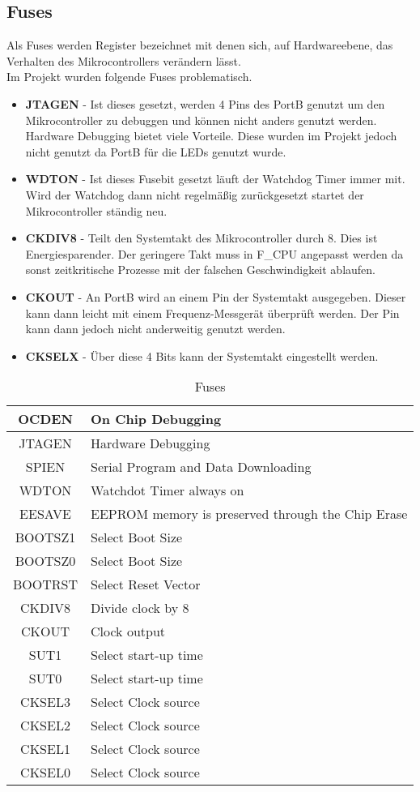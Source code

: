 \subsection{Fuses}
\label{sec:Fuses}
Als Fuses werden Register bezeichnet mit denen sich, auf Hardwareebene, das Verhalten des Mikrocontrollers verändern lässt. \\
Im Projekt wurden folgende Fuses problematisch.
\begin{itemize}
\item \textbf{JTAGEN} - Ist dieses  gesetzt, werden 4 Pins des PortB genutzt um den Mikrocontroller zu debuggen und können nicht anders genutzt werden. Hardware Debugging bietet viele Vorteile. Diese wurden im Projekt jedoch nicht genutzt da PortB für die LEDs genutzt wurde.
\item \textbf{WDTON} - Ist dieses Fusebit gesetzt läuft der Watchdog Timer immer mit. Wird der Watchdog dann nicht regelmäßig zurückgesetzt startet der Mikrocontroller ständig neu.
\item \textbf{CKDIV8} - Teilt den Systemtakt des Mikrocontroller durch 8. Dies ist Energiesparender. Der geringere Takt muss in F\_CPU angepasst werden da sonst zeitkritische Prozesse mit der falschen Geschwindigkeit ablaufen.
\item \textbf{CKOUT} - An PortB wird an einem Pin der Systemtakt ausgegeben. Dieser kann dann leicht mit einem Frequenz-Messgerät überprüft werden. Der Pin kann dann jedoch nicht anderweitig genutzt werden.
\item \textbf{CKSELX} - Über diese 4 Bits kann der Systemtakt eingestellt werden.
\end{itemize}
\begin{longtable}{|c|l|} 
\caption{Fuses} \\
\hline
\label{tab:TD_VI-910}
OCDEN & On Chip Debugging \\ \hline 
JTAGEN & Hardware Debugging \\ \hline 
SPIEN & Serial Program and Data Downloading \\ \hline 
WDTON & Watchdot Timer always on \\ \hline 
EESAVE & EEPROM memory is preserved through the Chip Erase \\ \hline 
BOOTSZ1 & Select Boot Size \\ \hline 
BOOTSZ0 & Select Boot Size \\ \hline 
BOOTRST & Select Reset Vector \\ \hline 
CKDIV8 & Divide clock by 8 \\ \hline 
CKOUT & Clock output \\ \hline 
SUT1 & Select start-up time \\ \hline 
SUT0 & Select start-up time \\ \hline 
CKSEL3 & Select Clock source \\ \hline 
CKSEL2 & Select Clock source \\ \hline 
CKSEL1 & Select Clock source \\ \hline 
CKSEL0 & Select Clock source \\ \hline 
\end{longtable} 



